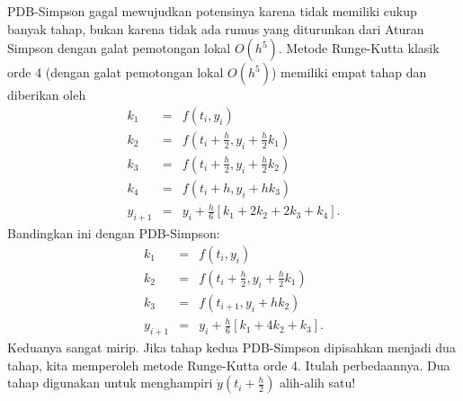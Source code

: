 PDB-Simpson gagal mewujudkan potensinya karena tidak memiliki cukup
banyak tahap, bukan karena tidak ada rumus yang diturunkan dari Aturan
Simpson dengan galat pemotongan lokal $O(h^{5})$. Metode Runge-Kutta
klasik orde 4 (dengan galat pemotongan lokal $O(h^{5})$) memiliki
empat tahap dan diberikan oleh
\begin{eqnarray*}
k_{1} & = & f(t_{i},y_{i})\\
k_{2} & = & f\left(t_{i}+\frac{h}{2},y_{i}+\frac{h}{2}k_{1}\right)\\
k_{3} & = & f\left(t_{i}+\frac{h}{2},y_{i}+\frac{h}{2}k_{2}\right)\\
k_{4} & = & f\left(t_{i}+h,y_{i}+hk_{3}\right)\\
y_{i+1} & = & y_{i}+\frac{h}{6}\left[k_{1}+2k_{2}+2k_{3}+k_{4}\right].
\end{eqnarray*}
Bandingkan ini dengan PDB-Simpson:
\begin{eqnarray*}
k_{1} & = & f(t_{i},y_{i})\\
k_{2} & = & f\left(t_{i}+\frac{h}{2},y_{i}+\frac{h}{2}k_{1}\right)\\
k_{3} & = & f(t_{i+1},y_{i}+hk_{2})\\
y_{i+1} & = & y_{i}+\frac{h}{6}\left[k_{1}+4k_{2}+k_{3}\right].
\end{eqnarray*}
Keduanya sangat mirip. Jika tahap kedua PDB-Simpson dipisahkan menjadi
dua tahap, kita memperoleh metode Runge-Kutta orde 4. Itulah perbedaannya.
Dua tahap digunakan untuk menghampiri $\dot{y}(t_{i}+\frac{h}{2})$
alih-alih satu!

